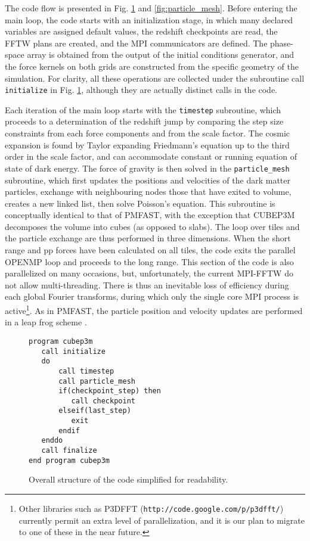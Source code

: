 The code flow is presented in Fig. \ref{fig:structure} and \ref{fig:particle_mesh}.
Before entering the main loop, the code starts with an initialization stage, 
in which many declared variables are assigned default values,
the redshift checkpoints are read, the {\small FFTW} plans are created, and the {\small MPI} communicators are defined.
The phase-space array  is obtained from the output of the initial conditions generator,
and the force kernels on both grids are constructed from the specific geometry of the simulation.
For clarity, all these operations are collected under the subroutine call {\tt initialize} in Fig. \ref{fig:structure}, 
although they are actually distinct calls in the code.

Each iteration of the main loop starts with the {\tt timestep} subroutine, 
which proceeds to a determination of the redshift jump by comparing the step size constraints from each
force components and from the scale factor.
The cosmic expansion is found by Taylor expanding Friedmann's equation up to the third order in the scale factor,
and can accommodate constant or running equation of state of dark energy.
The force of gravity is then solved  in the {\tt particle\_mesh} subroutine,
which first updates the positions and velocities of the dark matter particles, exchange with neighbouring nodes those that have exited to volume,
creates a new linked list, then solve Poisson's equation.  This subroutine is conceptually identical to that of {\small PMFAST}, 
with the exception  that {\small CUBEP3M} decomposes the volume into cubes (as opposed to slabs). 
The loop over tiles and the particle exchange are thus performed in three dimensions.
When the short range and pp forces have been calculated on all tiles, the code exits the parallel {\small OPENMP} loop
and proceeds to the long range. This section of the code is also parallelized on many occasions, but, unfortunately, the current {\small MPI-FFTW}
do not allow multi-threading. There is thus an inevitable loss of efficiency during each global Fourier transforms, during which
only the single core {\small MPI} process is active\footnote{Other libraries such as {\small P3DFFT} ({\tt http://code.google.com/p/p3dfft/}) currently permit
 an extra level of parallelization, and it is our plan to migrate to one of these in the near future.}.
 As in {\small PMFAST}, the particle position and velocity updates are performed in a leap frog scheme \citep{1981csup.book.....H}.

\begin{figure}
\begin{verbatim}
program cubep3m
   call initialize
   do
       call timestep
       call particle_mesh
       if(checkpoint_step) then
          call checkpoint
       elseif(last_step)
          exit
       endif
   enddo
   call finalize
end program cubep3m
\end{verbatim}
\caption{Overall structure of the code simplified for readability.}
\label{fig:structure}
\end{figure}

